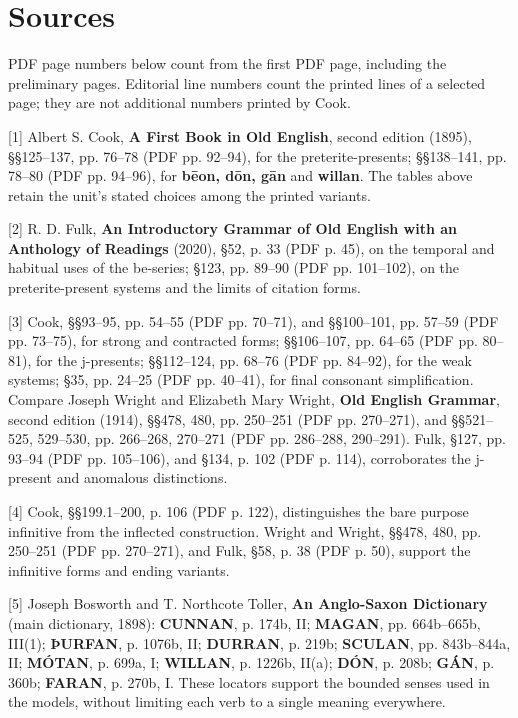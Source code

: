 \clearpage
\section*{Sources}

\begingroup\fontsize{10}{12.8}\selectfont
PDF page numbers below count from the first PDF page, including the preliminary pages. Editorial line numbers count the printed lines of a selected page; they are not additional numbers printed by Cook.

[1] Albert S. Cook, \textbf{A First Book in Old English}, second edition (1895), §§125–137, pp. 76–78 (PDF pp. 92–94), for the preterite-presents; §§138–141, pp. 78–80 (PDF pp. 94–96), for \textbf{bēon, dōn, gān} and \textbf{willan}. The tables above retain the unit’s stated choices among the printed variants.

[2] R. D. Fulk, \textbf{An Introductory Grammar of Old English with an Anthology of Readings} (2020), §52, p. 33 (PDF p. 45), on the temporal and habitual uses of the be-series; §123, pp. 89–90 (PDF pp. 101–102), on the preterite-present systems and the limits of citation forms.

[3] Cook, §§93–95, pp. 54–55 (PDF pp. 70–71), and §§100–101, pp. 57–59 (PDF pp. 73–75), for strong and contracted forms; §§106–107, pp. 64–65 (PDF pp. 80–81), for the j-presents; §§112–124, pp. 68–76 (PDF pp. 84–92), for the weak systems; §35, pp. 24–25 (PDF pp. 40–41), for final consonant simplification. Compare Joseph Wright and Elizabeth Mary Wright, \textbf{Old English Grammar}, second edition (1914), §§478, 480, pp. 250–251 (PDF pp. 270–271), and §§521–525, 529–530, pp. 266–268, 270–271 (PDF pp. 286–288, 290–291). Fulk, §127, pp. 93–94 (PDF pp. 105–106), and §134, p. 102 (PDF p. 114), corroborates the j-present and anomalous distinctions.

[4] Cook, §§199.1–200, p. 106 (PDF p. 122), distinguishes the bare purpose infinitive from the inflected construction. Wright and Wright, §§478, 480, pp. 250–251 (PDF pp. 270–271), and Fulk, §58, p. 38 (PDF p. 50), support the infinitive forms and ending variants.

[5] Joseph Bosworth and T. Northcote Toller, \textbf{An Anglo-Saxon Dictionary} (main dictionary, 1898): \textbf{CUNNAN}, p. 174b, II; \textbf{MAGAN}, pp. 664b–665b, III(1); \textbf{ÞURFAN}, p. 1076b, II; \textbf{DURRAN}, p. 219b; \textbf{SCULAN}, pp. 843b–844a, II; \textbf{MÓTAN}, p. 699a, I; \textbf{WILLAN}, p. 1226b, II(a); \textbf{DÓN}, p. 208b; \textbf{GÁN}, p. 360b; \textbf{FARAN}, p. 270b, I. These locators support the bounded senses used in the models, without limiting each verb to a single meaning everywhere.

